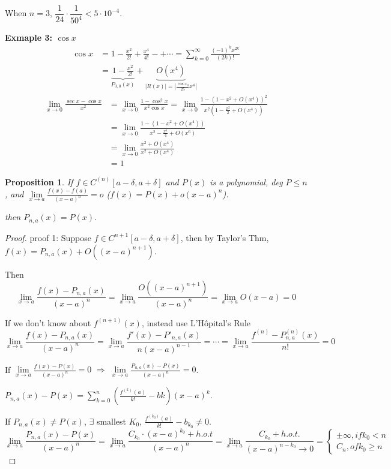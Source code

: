 \documentclass[12pt]{article}
\newcommand{\abs}[1]{\left| #1 \right|}
\theoremstyle{plain}
\newtheorem{proposition}{Proposition}[subsection]
\newcommand{\dlim}{\displaystyle\lim\limits}
\begin{document}
{	When $n=3$, $\dfrac1{24} \cdot \dfrac1{50^4} < 5\cdot 10^{-4}$.

	\textbf{Exmaple 3: $\cos x$}
	\begin{align*}
		\cos x
		&= 1 -\frac{x^2}{2!}+\frac{x^4}{4!}-+\cdots
		=\sum_{k=0}^{\infty}\frac{(-1)^kx^{2k}}{(2k)!}\\
		&= \underbrace{1-\frac{x^2}{2!}}_{P_{3,0}(x)}+
		\underbrace{O(x^4)}_{\abs{R(x)}=\abs{\frac{\cos x_0}{25}x^4}}
	\end{align*}
	\begin{align*}
		\dlim_{x\to 0} \frac{\sec x-\cos x}{x^2} 
		&=\dlim_{x\to 0}\frac{1-\cos ^2 x}{x^2\cos x}
		=\dlim_{x\to 0} \frac{1-(1-x^2+O(x^4))^2}{x^2(1-\frac{x^2}2+O(x^4))}\\
		&=\dlim_{x\to 0}\frac{1-(1-x^2+O(x^4))}{x^2-\frac{x^4}4+O(x^6)}\\
		&=\dlim_{x\to 0}\frac{x^2+O(x^4)}{x^2+O(x^4)}\\
		&=1
	\end{align*}}
	

	\begin{proposition}
		If $f\in C^{(n)} [a-\delta , a+\delta]$ and $P(x)$ is a polynomial, 
		deg $P\leq n$, and $\dlim_{x\to a} \frac{f(x)-f(a)}{(x-a)^n} = o$ 
		($f(x) = P(x) + o(x-a)^n$).

		then $P_{n,a}(x) = P(x)$.
	\end{proposition}
	\begin{proof}
	proof 1: Suppose $f \in C^{n+1} [a-\delta, a+\delta]$, then by Taylor's Thm,
	$f(x) = P_{n,a}(x)+O((x-a)^{n+1})$.
	
	Then 
	\[
		\dlim_{x\to a} \frac{f(x)-P_{n,a}(x)}{(x-a)^n} 
		=\dlim_{x\to a} \frac{O((x-a)^{n+1})}{(x-a)^n} = \dlim_{x\to a}O(x-a) = 0
	\]

	If we don't know about $f^{(n+1)}(x)$, instead use L'H\^{o}pital's Rule
	\[ 
			\dlim_{x\to a} \frac{f(x)-P_{n,a}(x)}{(x-a)^n} 
			=\dlim_{x\to a} \frac{f'(x)-P'_{n,a}(x)}{n(x-a)^{n-1}}
			=\cdots=\dlim_{x\to a} \frac{f^{(n)}-P_{n,a}^{(n)}(x)}{n!} = 0
	\]
	
	If $\dlim_{x\to a}\frac{f(x)-P(x)}{(x-a)^n} = 0$
	$\Rightarrow$ $\dlim_{x\to a}\frac{P_{n,a}(x)-P(x)}{(x-a)^n} = 0$.

	$P_{n,a}(x)-P(x) = \sum_{k=0}^n (\frac{f^{(k)}(a)}{k!}-bk)(x-a)^k$.

	If $P_{n,a}(x) \neq P(x)$, $\exists$ smallest $K_0$, 
	$\frac{f^{(k_0)}(a)}{k!} - b_{k_0} \neq 0$.
	\[
		\dlim_{x\to a}\frac{P_{n,a}(x)- P(x)}{(x-a)^n} 
		=\dlim_{x\to a}\frac{C_{k_0} \cdot (x-a)^{k_0}+h.o.t}{(x-a)^n} 
		=\dlim_{x\to a}\frac{C_{k_0}+h.o.t.}{(x-a)^{n-k_0}\to 0} 
		=\begin{cases}
			\pm \infty, if k_0<n\\
			C_n, of k_0\geq n
		\end{cases}
	\]
	\end{proof}
\end{document}
